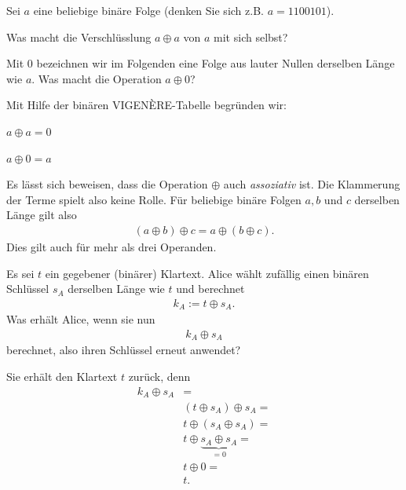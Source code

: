 \begin{myexercise}
	Sei $a$ eine beliebige binäre Folge (denken Sie sich z.B. $a = 1100101$).
	\begin{aenum}
		\item Was macht die Verschlüsslung $a\oplus a$ von $a$ mit sich selbst?
		\item Mit $0$ bezeichnen wir im Folgenden eine Folge aus lauter Nullen derselben Länge wie $a$. Was macht die Operation $a\oplus 0$?
	\end{aenum}
	\begin{myanswer}
		Mit Hilfe der binären VIGENÈRE-Tabelle begründen wir:
		\begin{aenum}
			\item $a\oplus a = 0$
			\item $a\oplus 0 = a$
		\end{aenum}
	\end{myanswer}
\end{myexercise}
Es lässt sich beweisen, dass die Operation $\oplus$ auch \textit{assoziativ} ist. Die Klammerung der Terme spielt also keine Rolle. Für beliebige binäre Folgen $a,b$ und $c$ derselben Länge gilt also
\begin{align*}
	(a\oplus b) \oplus c = a\oplus (b\oplus c).
\end{align*}
Dies gilt auch für mehr als drei Operanden.

\begin{myexercise}
	Es sei $t$ ein gegebener (binärer) Klartext. Alice wählt zufällig einen binären Schlüssel $s_A$ derselben Länge wie $t$ und berechnet
	\begin{align*}
		k_A := t\oplus s_A.
	\end{align*}
	Was erhält Alice, wenn sie nun
	\begin{align*}
		k_A\oplus s_A
	\end{align*}
	berechnet, also ihren Schlüssel erneut anwendet?
	\begin{myanswer}
		Sie erhält den Klartext $t$ zurück, denn
		\begin{align*}
			k_A\oplus s_A & =                                          \\
			              & (t\oplus s_A)\oplus s_A =                  \\
			              & t\oplus (s_A\oplus s_A) =                  \\
			              & t\oplus \underbrace{s_A\oplus s_A}_{= 0} = \\
			              & t\oplus 0 =                                \\
			              & t.
		\end{align*}
	\end{myanswer}
\end{myexercise}


